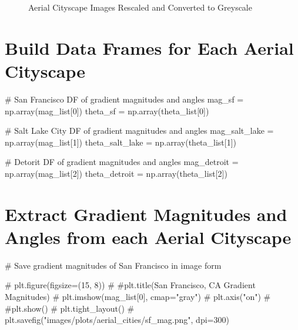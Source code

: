 \documentclass[
  letterpaper,
  DIV=11,
  numbers=noendperiod]{scrreprt}
\newenvironment{Shaded}{\begin{snugshade}}{\end{snugshade}}
\newcommand{\CommentTok}[1]{\textcolor[rgb]{0.37,0.37,0.37}{#1}}
\newcommand{\DecValTok}[1]{\textcolor[rgb]{0.68,0.00,0.00}{#1}}
\newcommand{\NormalTok}[1]{\textcolor[rgb]{0.00,0.23,0.31}{#1}}
\newcommand{\OperatorTok}[1]{\textcolor[rgb]{0.37,0.37,0.37}{#1}}
\begin{document}
\begin{figure}
\begin{minipage}{0.33\linewidth}
\begin{figure}[H]
{}


\end{figure}%

\end{minipage}%

\caption{\label{fig-city-images}Aerial Cityscape Images Rescaled and
Converted to Greyscale}

\end{figure}%

\section{Build Data Frames for Each Aerial
Cityscape}\label{build-data-frames-for-each-aerial-cityscape}

\begin{Shaded}
\begin{Highlighting}[]
\CommentTok{\# San Francisco DF of gradient magnitudes and angles}
\NormalTok{mag\_sf }\OperatorTok{=}\NormalTok{ np.array(mag\_list[}\DecValTok{0}\NormalTok{])}
\NormalTok{theta\_sf }\OperatorTok{=}\NormalTok{ np.array(theta\_list[}\DecValTok{0}\NormalTok{])}

\CommentTok{\# Salt Lake City DF of gradient magnitudes and angles}
\NormalTok{mag\_salt\_lake }\OperatorTok{=}\NormalTok{ np.array(mag\_list[}\DecValTok{1}\NormalTok{])}
\NormalTok{theta\_salt\_lake }\OperatorTok{=}\NormalTok{ np.array(theta\_list[}\DecValTok{1}\NormalTok{])}

\CommentTok{\# Detorit DF of gradient magnitudes and angles}
\NormalTok{mag\_detroit }\OperatorTok{=}\NormalTok{ np.array(mag\_list[}\DecValTok{2}\NormalTok{])}
\NormalTok{theta\_detroit }\OperatorTok{=}\NormalTok{ np.array(theta\_list[}\DecValTok{2}\NormalTok{])}
\end{Highlighting}
\end{Shaded}

\section{Extract Gradient Magnitudes and Angles from each Aerial
Cityscape}\label{extract-gradient-magnitudes-and-angles-from-each-aerial-cityscape}

\begin{Shaded}
\begin{Highlighting}[]
\CommentTok{\# Save gradient magnitudes of San Francisco in image form}

\CommentTok{\# plt.figure(figsize=(15, 8))}
\CommentTok{\# \#plt.title(\textquotesingle{}San Francisco, CA Gradient Magnitudes\textquotesingle{})}
\CommentTok{\# plt.imshow(mag\_list[0], cmap="gray")}
\CommentTok{\# plt.axis("on")}
\CommentTok{\# \#plt.show()}
\CommentTok{\# plt.tight\_layout()}
\CommentTok{\# plt.savefig("images/plots/aerial\_cities/sf\_mag.png", dpi=300)}
\end{Highlighting}
\end{Shaded}
\end{document}

